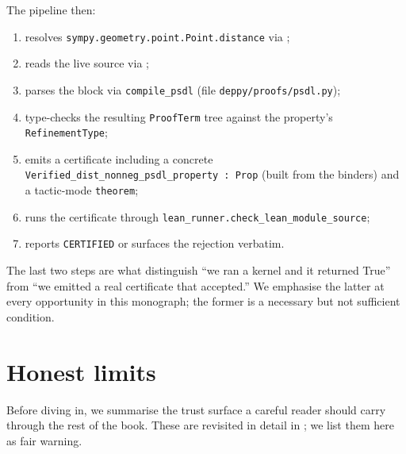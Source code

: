 The pipeline then:
\begin{enumerate}[leftmargin=1.7em]
  \item resolves \texttt{sympy.geometry.point.Point.distance} via
    \Importlib;
  \item reads the live source via \Inspect{};
  \item parses the \PSDL{} block via \texttt{compile\_psdl} (file
    \texttt{deppy/proofs/psdl.py});
  \item type-checks the resulting \texttt{ProofTerm} tree against the
    property's \texttt{RefinementType};
  \item emits a \Lean{} certificate including a concrete
    \texttt{Verified\_dist\_nonneg\_psdl\_property : Prop} (built from
    the binders) and a tactic-mode \texttt{theorem};
  \item runs the certificate through \texttt{lean\_runner.check\_\-lean\_\-module\_source};
  \item reports \texttt{CERTIFIED} or surfaces the \Lean{}
    rejection verbatim.
\end{enumerate}

The last two steps are what distinguish ``we ran a kernel and it
returned True'' from ``we emitted a real \Lean{} certificate that
\Lean{} accepted.''  We emphasise the latter at every opportunity in
this monograph; the former is a necessary but not sufficient
condition.

\section{Honest limits}
\label{sec:honest-limits}

Before diving in, we summarise the trust surface a careful reader
should carry through the rest of the book.  These are revisited in
detail in ; we list them here as fair warning.

